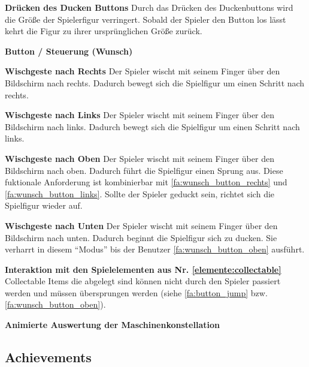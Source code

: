 \documentclass{scrartcl}
\begin{document}
\begin{falist}[resume]
\begin{falist}
    	\item \label{fa:button_ducken} \textbf{Drücken des Ducken Buttons} Durch das Drücken des Duckenbuttons wird die Größe der Spielerfigur verringert. Sobald der Spieler den Button los lässt kehrt die Figur zu ihrer ursprünglichen Größe zurück.
    \end{falist}
    \item \label{fa:button_wunsch} \textbf{Button / Steuerung (Wunsch)}
    \begin{falist}
    	\item \label{fa:wunsch_button_rechts} \textbf{Wischgeste nach Rechts} Der Spieler wischt mit seinem Finger über den Bildschirm nach rechts. Dadurch bewegt sich die Spielfigur um einen Schritt nach rechts.
    	\item \label{fa:wunsch_button_links} \textbf{Wischgeste nach Links} Der Spieler wischt mit seinem Finger über den Bildschirm nach links. Dadurch bewegt sich die Spielfigur um einen Schritt nach links.
    	\item \label{fa:wunsch_button_oben} \textbf{Wischgeste nach Oben} Der Spieler wischt mit seinem Finger über den Bildschirm nach oben. Dadurch führt die Spielfigur einen Sprung aus. Diese fuktionale Anforderung ist kombinierbar mit \ref{fa:wunsch_button_rechts} und \ref{fa:wunsch_button_links}. Sollte der Spieler geduckt sein, richtet sich die Spielfigur wieder auf.
    	\item \label{fa:wunsch_button_unten} \textbf{Wischgeste nach Unten} Der Spieler wischt mit seinem Finger über den Bildschirm nach unten. Dadurch beginnt die Spielfigur sich zu ducken. Sie verharrt in diesem \enquote{Modus} bis der Benutzer \ref{fa:wunsch_button_oben} ausführt.
    \end{falist}
	\item \textbf{Interaktion mit den Spielelementen aus Nr. \ref{elemente:collectable}} Collectable Items die abgelegt sind können nicht durch den Spieler passiert werden und müssen übersprungen werden (siehe \ref{fa:button_jump} bzw. \ref{fa:wunsch_button_oben}).
	\item \label{fa:auswertung_animiert} \textbf{Animierte Auswertung der Maschinenkonstellation}
	\begin{falist}
		\item 
	\end{falist}
\end{falist}

\subsection{Achievements}
\end{document}
